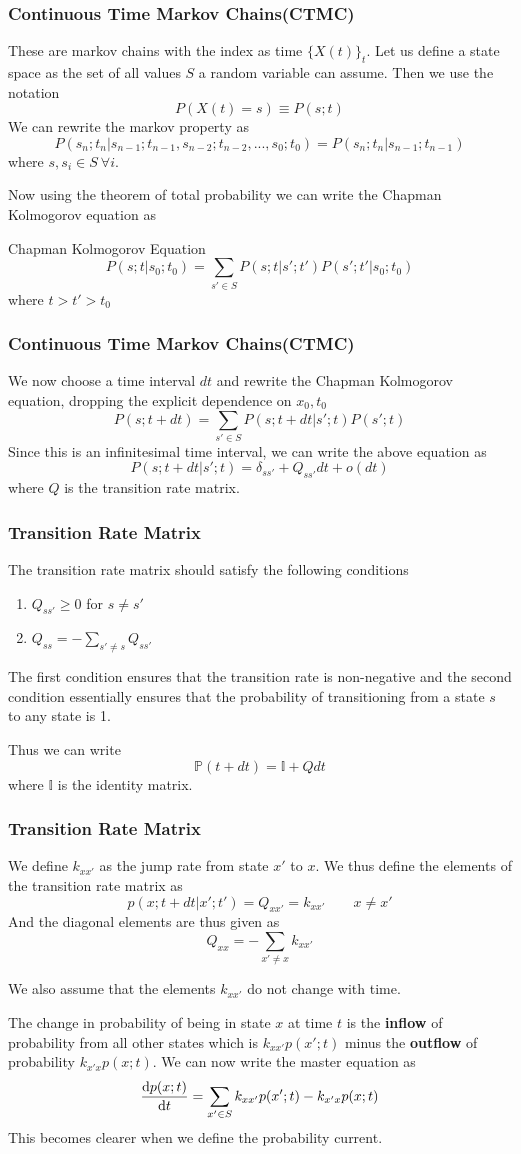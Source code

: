 \documentclass[9pt]{beamer}
\begin{document}
\begin{frame}
  \frametitle{Continuous Time Markov Chains(CTMC)}
  These are markov chains with the index as time $\{X(t)\}_t$. Let us define a state space as the 
  set of all values $S$ a random variable can assume. Then we use the notation 
  $$ P(X(t) = s) \equiv P(s;t)$$
  We can rewrite the markov property as 
  $$ P(s_n;t_n|s_{n-1};t_{n-1},s_{n-2};t_{n-2},...,s_0;t_0) = P(s_n;t_n|s_{n-1};t_{n-1})$$
  where $s,s_i \in S ~ \forall i$.

  Now using the theorem of total probability we can write the Chapman Kolmogorov equation as
  \begin{block}{Chapman Kolmogorov Equation}
  $$ P(s;t|s_0;t_0) = \sum_{s' \in S} P(s;t|s';t')P(s';t'|s_0;t_0)$$ where $t > t' > t_0$
  \end{block}
\end{frame}
\begin{frame}
  \frametitle{Continuous Time Markov Chains(CTMC)}
  We now choose a time interval $dt$ and rewrite the Chapman Kolmogorov equation, dropping the 
  explicit dependence on $x_0,t_0$
  $$ P(s;t+dt) = \sum_{s' \in S} P(s;t+dt|s';t)P(s';t)$$
  Since this is an infinitesimal time interval, we can write the above equation as
  $$ P(s;t+dt|s';t) = \delta_{ss'} +Q_{ss'}dt + o(dt)$$
  where $Q$ is the transition rate matrix. 
\end{frame}

\begin{frame}
  \frametitle{Transition Rate Matrix}
  The transition rate matrix should satisfy the following conditions 
  \begin{enumerate}
    \item $Q_{ss'} \geq 0$ for $s \neq s'$
    \item $Q_{ss} = -\sum_{s' \neq s} Q_{ss'}$
  \end{enumerate}
  The first condition ensures that the transition rate is non-negative and the second condition
  essentially ensures that the probability of transitioning from a state $s$ to any state is 1.
  
  Thus we can write 
  $$\mathbb{P}(t+dt) = \mathbb{I} + Qdt$$ where $\mathbb{I}$ is the identity matrix.

\end{frame}

\begin{frame}
  \frametitle{Transition Rate Matrix}
  We define $k_{xx'}$ as the jump rate from state $x'$ to $x$.
  We thus define the elements of the transition rate matrix as
  $$ p(x;t+dt|x';t' ) = Q_{xx'} = k_{xx'} \quad \quad x \neq x'$$
  And the diagonal elements are thus given as 
  $$Q_{xx} = -\sum_{x' \neq x} k_{xx'}$$

  We also assume that the elements $k_{xx'}$ do not change with time.

  The change in probability of being in state $x$ at time $t$ is the \textbf{inflow} of probability from all other states
  which is $ k_{xx'}p(x';t)$ minus the \textbf{outflow} of probability  $k_{x'x}p(x;t)$.
  We can now write the master equation as
  $$\dv{p(x;t)}{t} = \sum_{x' \in S} k_{xx'}p(x';t) - k_{x'x}p(x;t)$$
  This becomes clearer when we define the probability current.
\end{frame}
\end{document}
